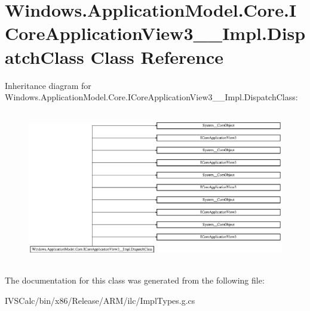 \hypertarget{class_windows_1_1_application_model_1_1_core_1_1_i_core_application_view3_____impl_1_1_dispatch_class}{}\section{Windows.\+Application\+Model.\+Core.\+I\+Core\+Application\+View3\+\_\+\+\_\+\+Impl.\+Dispatch\+Class Class Reference}
\label{class_windows_1_1_application_model_1_1_core_1_1_i_core_application_view3_____impl_1_1_dispatch_class}
Inheritance diagram for Windows.\+Application\+Model.\+Core.\+I\+Core\+Application\+View3\+\_\+\+\_\+\+Impl.\+Dispatch\+Class\+:\begin{figure}[H]
\begin{center}
\leavevmode
\includegraphics[height=6.739606cm]{class_windows_1_1_application_model_1_1_core_1_1_i_core_application_view3_____impl_1_1_dispatch_class}
\end{center}
\end{figure}


The documentation for this class was generated from the following file\+:\begin{DoxyCompactItemize}
\item 
I\+V\+S\+Calc/bin/x86/\+Release/\+A\+R\+M/ilc/Impl\+Types.\+g.\+cs\end{DoxyCompactItemize}
